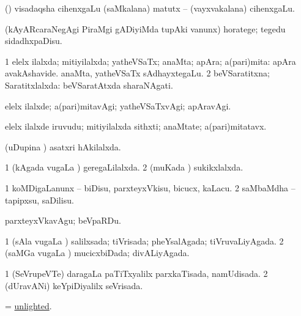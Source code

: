 \bentry
{}
\gl{\nA}
\expl{}
\bmng
(\ga) visadaqsha cihenxgaLu \eng{[+} (saMkalana) matutx -- (vayxvakalana) cihenxgaLu\eng{]}. 
\emng
\eentry

\bentry
{} 
\gl{\akirx}
\expl{}
\bmng
(kAyARcaraNegAgi PiraMgi gADiyiMda tupAki \mo vanunx) horatege; tegedu sidadhxpaDisu. 
\emng
\eentry

\bentry
{} 
\gl{\gu}
\expl{}
\bmng
\bnum
\num{1} elelx ilalxda; mitiyilalxda; yatheVSaTx; anaMta; apAra; a(pari)mita:  apAra avakAshavide.  anaMta, yatheVSaTx sAdhayxtegaLu. 
\num{2} beVSaratitxna; Saratitxlalxda:  beVSaratAtxda sharaNAgati. 
\enum
\emng
\eentry

\bentry
{} 
\gl{\kirxvi}
\expl{}
\bmng
elelx ilalxde; a(pari)mitavAgi; yatheVSaTxvAgi; apAravAgi. 
\emng
\eentry

\bentry
{} 
\gl{\nA}
\expl{}
\bmng
elelx ilalxde iruvudu; mitiyilalxda sithxti; anaMtate; a(pari)mitatavx. 
\emng
\eentry

\bentry
{} 
\gl{\gu}
\expl{}
\bmng
(uDupina \vi) asatxri hAkilalxda. 
\emng
\eentry

\bentry
{} 
\gl{\gu}
\expl{}
\bmng
\bnum
\num{1} (kAgada \mo vugaLa \vi) geregaLilalxda. 
\num{2} (muKada \vi) sukikxlalxda. 
\enum
\emng
\eentry

\bentry
{} 
\gl{\sakirx}
\expl{}
\bmng
\bnum
\num{1} koMDigaLanunx -- biDisu, parxteyxVkisu, bicucx, kaLacu. 
\num{2} saMbaMdha -- tapipxsu, saDilisu. 
\enum
\emng

\noindent 
\gl{\akirx}
\expl{}
\bmng
parxteyxVkavAgu; beVpaRDu. 
\emng
\eentry

\bentry
{} 
\gl{\gu}
\expl{}
\bmng
\bnum
\num{1} (sAla \mo vugaLa \vi) salilxsada; tiVrisada; pheYsalAgada; tiVruvaLiyAgada. 
\num{2} (saMGa \mo vugaLa \vi) mucicxbiDada; divALiyAgada. 
\enum
\emng
\eentry

\bentry
{} 
\gl{\gu}
\bmng
\bnum
\num{1} (SeVrupeVTe) daragaLa paTiTxyalilx parxkaTisada, namUdisada. 
\num{2} (dUravANi) keYpiDiyalilx seVrisada. 
\enum
\emng
\eentry

\bentry
{} 
\gl{\gu}
\bmng
= \hyperlink{unlighted}{unlighted}. 
\emng
\eentry


